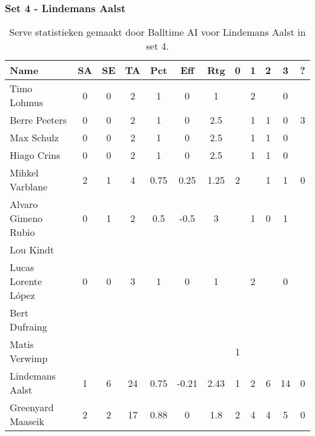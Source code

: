 \subsubsection{Set 4 - Lindemans Aalst}
\label{sec:PL3_Aalst4}

\begin{table}[ht!]
  \centering
  \scriptsize
  \begin{tabular}{|l|c|c|c|c|c|c|c|c|c|c|c|} \hline
    \textbf{Name} & SA & SE & TA & Pct & Eff & Rtg & 0 & 1 & 2 & 3 & ? \\ \hline
    Timo Lohmus & 0 & 0 & 2 & 1 & 0 & 1 &   & 2 &   & 0 &   \\
    Berre Peeters & 0 & 0 & 2 & 1 & 0 & 2.5 &   & 1 & 1 & 0 & 3 \\
    Max Schulz & 0 & 0 & 2 & 1 & 0 & 2.5 &   & 1 & 1 & 0 &   \\
    Hiago Crins & 0 & 0 & 2 & 1 & 0 & 2.5 &   & 1 & 1 & 0 &   \\
    Mihkel Varblane & 2 & 1 & 4 & 0.75 & 0.25 & 1.25 & 2 &   & 1 & 1 & 0 \\
    Alvaro Gimeno Rubio & 0 & 1 & 2 & 0.5 & -0.5 & 3 &   & 1 & 0 & 1 &   \\
    Lou Kindt &   &   &   &   &   &   &   &   &   &   &   \\
    Lucas Lorente López & 0 & 0 & 3 & 1 & 0 & 1 &   & 2 &   & 0 &   \\
    Bert Dufraing &   &   &   &   &   &   &   &   &   &   &   \\
    Matis Verwimp &   &   &   &   &   &   & 1 &   &   &   &   \\
    Lindemans Aalst & 1 & 6 & 24 & 0.75 & -0.21 & 2.43 & 1 & 2 & 6 & 14 & 0 \\
    Greenyard Maaseik & 2 & 2 & 17 & 0.88 & 0 & 1.8 & 2 & 4 & 4 & 5 & 0 \\ \hline
  \end{tabular}
  \caption[Serve statistieken gemaakt door Balltime AI voor Lindemans Aalst in set 4]{\label{tab:PL3ServeAalst4}Serve statistieken gemaakt door Balltime AI voor Lindemans Aalst in set 4.}
\end{table}

